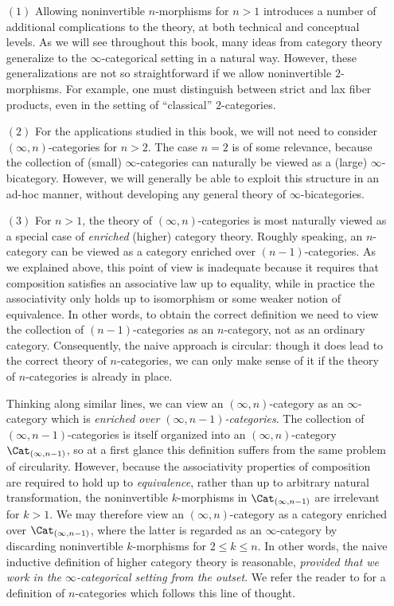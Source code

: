 \begin{itemize}
\item[$(1)$] Allowing noninvertible $n$-morphisms for $n > 1$ introduces a number of additional complications to the theory, at both technical and conceptual levels. As we will see throughout this book, many ideas from category theory generalize to the $\infty$-categorical setting in a natural way. However, these generalizations are not so straightforward if we allow noninvertible $2$-morphisms. For example, one must distinguish between strict and lax fiber products, even in the setting of ``classical'' $2$-categories.

\item[$(2)$] For the applications studied in this book, we will not need to consider $(\infty,n)$-categories for $n > 2$. The case $n=2$ is of some relevance, because the collection of (small) $\infty$-categories can naturally be viewed as a (large) $\infty$-bicategory. However, we will generally be able to exploit this structure in an ad-hoc manner, without developing any general theory of $\infty$-bicategories.

\item[$(3)$] For $n > 1$, the theory of $(\infty,n)$-categories is most naturally viewed as a special case of {\em enriched} (higher) category theory. Roughly speaking, an $n$-category can be viewed as a category enriched over $(n-1)$-categories. As we explained above, this point of view is inadequate because it requires that composition satisfies an associative law up to equality, while in practice the associativity only holds up to isomorphism or some weaker notion of equivalence.
In other words, to obtain the correct definition we need to view the collection of $(n-1)$-categories
as an $n$-category, not as an ordinary category. Consequently, the naive approach is circular:  though it does lead to the correct theory of $n$-categories, we can only make sense of it if the theory of $n$-categories is already in place.

Thinking along similar lines, we can view an $(\infty,n)$-category as an $\infty$-category which is {\em enriched over $(\infty,n-1)$-categories}. The collection of $(\infty,n-1)$-categories is itself organized into an $(\infty,n)$-category $\Cat_{(\infty,n-1)}$, so at a first glance this definition suffers from the same problem of circularity. However, because the associativity properties of composition are required to hold up to {\em equivalence}, rather than up to arbitrary natural transformation, the noninvertible $k$-morphisms in $\Cat_{(\infty,n-1)}$ are irrelevant for $k > 1$. We may therefore view an $(\infty,n)$-category as a category enriched over $\Cat_{(\infty,n-1)}$, where the latter is regarded as an $\infty$-category by discarding noninvertible $k$-morphisms for $2 \leq k \leq n$.
In other words, the naive inductive definition of higher category theory is reasonable, {\em provided that we work in the $\infty$-categorical setting from the outset}. 
We refer the reader to \cite{tamsamani} for a definition of $n$-categories which follows this line of thought.


\end{itemize}
